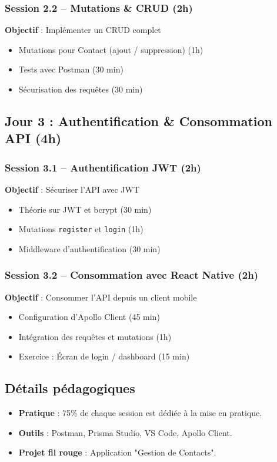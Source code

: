 \vspace{0.3cm}
\subsubsection*{Session 2.2 – Mutations & CRUD (2h)}
\textbf{Objectif} : Implémenter un CRUD complet
\begin{itemize}
  \item Mutations pour Contact (ajout / suppression) (1h)
  \item Tests avec Postman (30 min)
  \item Sécurisation des requêtes (30 min)
\end{itemize}

\vspace{0.5cm}
\subsection*{Jour 3 : Authentification & Consommation API (4h)}

\subsubsection*{Session 3.1 – Authentification JWT (2h)}
\textbf{Objectif} : Sécuriser l'API avec JWT
\begin{itemize}
  \item Théorie sur JWT et bcrypt (30 min)
  \item Mutations \texttt{register} et \texttt{login} (1h)
  \item Middleware d'authentification (30 min)
\end{itemize}

\vspace{0.3cm}
\subsubsection*{Session 3.2 – Consommation avec React Native (2h)}
\textbf{Objectif} : Consommer l’API depuis un client mobile
\begin{itemize}
  \item Configuration d'Apollo Client (45 min)
  \item Intégration des requêtes et mutations (1h)
  \item Exercice : Écran de login / dashboard (15 min)
\end{itemize}

\vspace{0.5cm}
\subsection*{Détails pédagogiques}
\begin{itemize}
  \item \textbf{Pratique} : 75\% de chaque session est dédiée à la mise en pratique.
  \item \textbf{Outils} : Postman, Prisma Studio, VS Code, Apollo Client.
  \item \textbf{Projet fil rouge} : Application "Gestion de Contacts".
\end{itemize}

